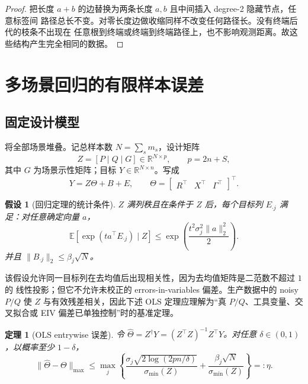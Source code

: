 \documentclass[UTF8,11pt]{ctexart}
\newtheorem{assumption}[definition]{假设}
\newtheorem{theorem}[definition]{定理}
\newcommand{\R}{\mathbb R}
\newcommand{\Ebb}{\mathbb E}
\begin{document}
\begin{proof}
把长度 $a+b$ 的边替换为两条长度 $a,b$ 且中间插入 degree-2 隐藏节点，任意标签间
路径总长不变。对零长度边做收缩同样不改变任何路径长。没有终端后代的枝条不出现在
任意根到终端或终端到终端路径上，也不影响观测距离。故这些结构产生完全相同的数据。
\end{proof}

\section{多场景回归的有限样本误差}

\subsection{固定设计模型}

将全部场景堆叠。记总样本数 $N=\sum_s m_s$，设计矩阵
\begin{equation}
 Z=[P\mid Q\mid G]\in\R^{N\times p},\qquad p=2n+S,
\end{equation}
其中 $G$ 为场景示性矩阵；目标 $Y\in\R^{N\times n}$。写成
\begin{equation}
 Y=Z\Theta+B+E,
 \qquad
 \Theta=\begin{bmatrix}R^\top&X^\top&\Gamma^\top\end{bmatrix}^\top.
 \label{eq:stacked-regression}
\end{equation}

\begin{assumption}[回归定理的统计条件]
\label{ass:regression}
$Z$ 满列秩且在条件于 $Z$ 后，每个目标列 $E_{\cdot j}$ 满足：对任意确定向量 $a$，
\begin{equation}
 \Ebb[\exp(t a^\top E_{\cdot j})\mid Z]
 \le \exp\!\left(\frac{t^2\sigma_j^2\|a\|_2^2}{2}\right).
 \label{eq:subgaussian-vector}
\end{equation}
并且 $\|B_{\cdot j}\|_2\le\beta_j\sqrt N$。
\end{assumption}

该假设允许同一目标列在去均值后出现相关性，因为去均值矩阵是二范数不超过 $1$ 的
线性投影；但它不允许未校正的 errors-in-variables 偏差。生产数据中的 noisy $P/Q$
使 $Z$ 与有效残差相关，因此下述 OLS 定理应理解为“真 $P/Q$、工具变量、交叉拟合或
EIV 偏差已单独控制”时的基准定理。

\begin{theorem}[OLS entrywise 误差]
\label{thm:ols-bound}
令 $\widehat\Theta=Z^\dagger Y=(Z^\top Z)^{-1}Z^\top Y$。对任意
$\delta\in(0,1)$，以概率至少 $1-\delta$，
\begin{equation}
 \|\widehat\Theta-\Theta\|_{\max}
 \le
 \max_j\left\{
 \frac{\sigma_j\sqrt{2\log(2pn/\delta)}}{\sigma_{\min}(Z)}
 +\frac{\beta_j\sqrt N}{\sigma_{\min}(Z)}
 \right\}
 =:\eta.
 \label{eq:ols-max-bound}
\end{equation}
\end{theorem}
\end{document}
